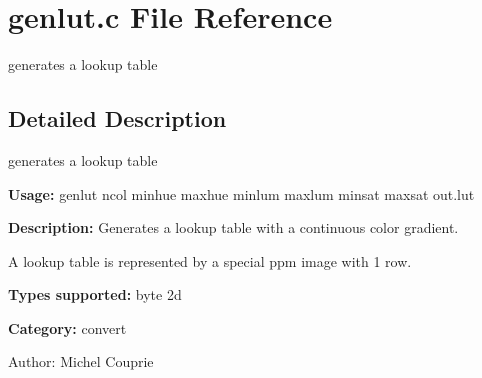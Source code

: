 \section{genlut.c File Reference}
\label{genlut_8c}
generates a lookup table 



\subsection{Detailed Description}
generates a lookup table 

{\bf Usage:} genlut ncol minhue maxhue minlum maxlum minsat maxsat out.lut

{\bf Description:} Generates a lookup table with a continuous color gradient.

A lookup table is represented by a special ppm image with 1 row.

{\bf Types supported:} byte 2d

{\bf Category:} convert

\begin{Desc}
\item[Author:]Michel Couprie \end{Desc}
